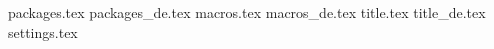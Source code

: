 {packages.tex}
{packages_de.tex}
{macros.tex}
{macros_de.tex}
{title.tex}
{title_de.tex}
{settings.tex}
